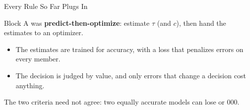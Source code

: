 \documentclass[aspectratio=169, 11pt, handout]{beamer}
\newcommand{\SE}{\operatorname{SE}}
\newcommand{\hatt}{\hat{\tau}}
\begin{document}
\begin{frame}{Every Rule So Far Plugs In}

\begin{center}
\end{center}

\bigskip

Block A was \textbf{predict-then-optimize}: estimate $\tau$ (and $c$), then hand the estimates to an optimizer.

\begin{itemize}
  \item The estimates are trained for accuracy, with a loss that penalizes errors on every member.
  \item The decision is judged by value, and only errors that change a decision cost anything.
\end{itemize}

\medskip

The two criteria need not agree: two equally accurate models can lose  or 000.
\end{frame}
\end{document}
